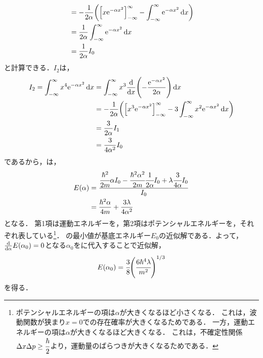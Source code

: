 \documentclass{report}
\begin{document}
\begin{myex}{}{}
\begin{align}
      &= -\frac{1}{2\alpha}\qty(\qty[x\mathrm{e}^{-\alpha x^2}]_{-\infty}^{\infty} - \int_{-\infty}^{\infty}\mathrm{e}^{-\alpha x^2}\dd{x}) \\ 
      &= \frac{1}{2\alpha} \int_{-\infty}^{\infty}\mathrm{e}^{-\alpha x^2}\dd{x} \\ 
      &= \frac{1}{2\alpha} I_0\label{E1-I1}
    \end{align}
    と計算できる．$I_2$は，
    \begin{align}
      I_2 = \int_{-\infty}^{\infty}x^4\mathrm{e}^{-\alpha x^2} \dd{x} &= \int_{-\infty}^{\infty}x^3\dv{x}\qty(-\frac{\mathrm{e}^{-\alpha x^2}}{2\alpha}) \dd{x} \\ 
      &= -\frac{1}{2\alpha}\qty(\qty[x^3\mathrm{e}^{-\alpha x^2}]_{-\infty}^{\infty} - 3\int_{-\infty}^{\infty}x^2\mathrm{e}^{-\alpha x^2}\dd{x}) \\ 
      &= \frac{3}{2\alpha}I_1 \\ 
      &= \frac{3}{4\alpha^2}I_0
    \end{align}
    であるから，は，
    \begin{align}
      E(\alpha) &= \frac{\cfrac{\hbar^2}{2m}\alpha I_0 - \cfrac{\hbar^2\alpha^2}{2m}\cfrac{1}{2\alpha}I_0 + \lambda\cfrac{3}{4\alpha} I_0}{I_0} \\ 
      &= \frac{\hbar^2\alpha}{4m} + \frac{3\lambda}{4\alpha^2}
    \end{align}
    となる．
    第1項は運動エネルギーを，第2項はポテンシャルエネルギーを，それぞれ表している\footnote{
      ポテンシャルエネルギーの項は$\alpha$が大きくなるほど小さくなる．
      これは，波動関数が狭まり$x=0$での存在確率が大きくなるためである．
      一方，運動エネルギーの項は$\alpha$が大きくなるほど大きくなる．
      これは，不確定性関係$\Delta x\Delta p \geq \cfrac{\hbar}{2}$より，運動量のばらつきが大きくなるためである．
    }．
    の最小値が基底エネルギー$E_0$の近似解である．よって，$\dv{\alpha}E(\alpha_0) = 0$となる$\alpha_0$をに代入することで近似解，
    \begin{align}
      E(\alpha_0) = \cfrac{3}{8}\qty(\cfrac{6\hbar^4\lambda}{m^2})^{1/3}
    \end{align}
    を得る．
  \end{myex}
\end{document}
